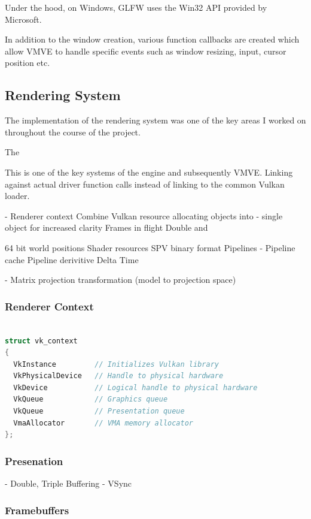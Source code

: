 \documentclass[11pt]{article}
\begin{document}
Under the hood, on Windows, GLFW uses the Win32 API provided by Microsoft.

In addition to the window creation, various function callbacks are created
which allow VMVE to handle specific events such as window resizing, input,
cursor position etc.

\subsection{Rendering System}

The implementation of the rendering system was one of the key areas
I worked on throughout the course of the project.

The 

This is one of the key systems of the engine and subsequently VMVE.
 Linking against actual driver function calls instead of linking to
 the common Vulkan loader.  \cite{volk}

- Renderer context Combine Vulkan resource allocating objects into
-   single object for increased clarity 
    Frames in flight 
    Double and

64 bit world positions 
Shader resources SPV binary format 
    Pipelines
-   Pipeline cache 
Pipeline derivitive 
Delta Time

- Matrix projection transformation (model to projection space)


\subsubsection{Renderer Context}
\begin{lstlisting}[language=C++]

struct vk_context
{
  VkInstance         // Initializes Vulkan library
  VkPhysicalDevice   // Handle to physical hardware
  VkDevice           // Logical handle to physical hardware
  VkQueue            // Graphics queue
  VkQueue            // Presentation queue
  VmaAllocator       // VMA memory allocator
};


\end{lstlisting}

\subsubsection{Presenation}

- Double, Triple Buffering
- VSync

\subsubsection{Framebuffers}
\end{document}
